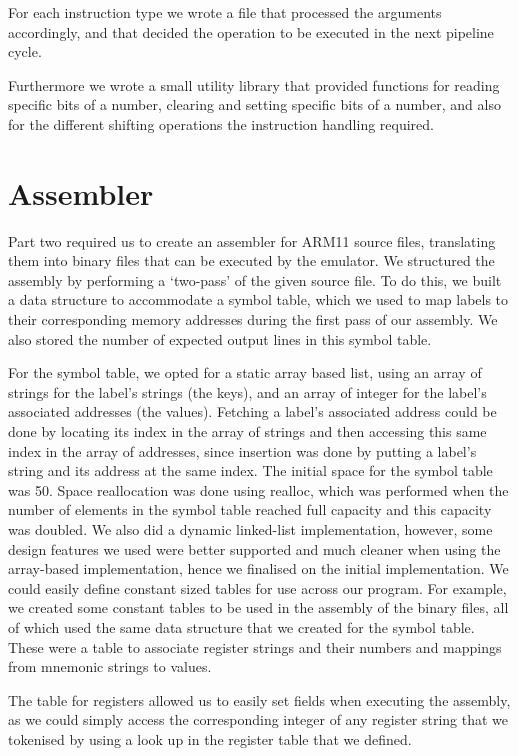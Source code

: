 \documentclass[11pt]{article}
\begin{document}
For each instruction type we wrote a file that processed the arguments accordingly, and that decided the operation to be executed in the next pipeline cycle.

Furthermore we wrote a small utility library that provided functions for reading specific bits of a number, clearing and setting specific bits of a number, and also for the different shifting operations the instruction handling required.

\section{Assembler}

Part two required us to create an assembler for ARM11 source files, translating them into binary files that can be executed by the emulator. We structured the assembly by performing a ‘two-pass’ of the given source file. To do this, we built a data structure to accommodate a symbol table, which we used to map labels to their corresponding memory addresses during the first pass of our assembly. We also stored the number of expected output lines in this symbol table. 

For the symbol table, we opted for a static array based list, using an array of strings for the label’s strings (the keys), and an array of integer for the label’s associated addresses (the values). Fetching a label’s associated address could be done by locating its index in the array of strings and then accessing this same index in the array of addresses, since insertion was done by putting a label’s string and its address at the same index. The initial space for the symbol table was 50. Space reallocation was done using realloc, which was performed when the number of elements in the symbol table reached full capacity  and this capacity was doubled. 
We also did a dynamic linked-list implementation, however, some design features we used were better supported and much cleaner when using the array-based implementation, hence we finalised on the initial implementation. We could easily define constant sized tables for use across our program. 
For example, we created some constant tables to be used in the assembly of the binary files, all of which used the same data structure that we created for the symbol table. These were a table to associate register strings and their numbers and mappings from mnemonic strings to values. 

The table for registers allowed us to easily set fields when executing the assembly, as we could simply access the corresponding integer of any register string that we tokenised by using a look up in the register table that we defined. 
\end{document}
